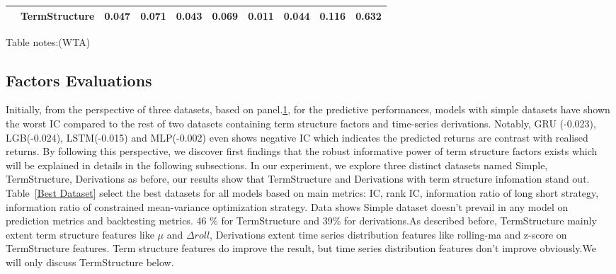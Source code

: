 \documentclass[10pt,letterpaper]{article}
\begin{document}
\begin{table}[!ht]
\begin{adjustwidth}{-2.25in}{0in}
\begin{tabular}{llrrrrp{1.5cm}p{1.5cm}p{1.5cm}p{1.5cm}}
    & TermStructure &  0.047 &  0.071 &    0.043 &      0.069 &                    0.011 &                    0.044 &                         0.116 &                         0.632 \\
\bottomrule
\end{tabular}
\begin{flushleft} Table notes:(WTA)
\end{flushleft}
\label{summary}
\end{adjustwidth}
\end{table}

\subsection*{Factors Evaluations}
Initially, from the perspective of three datasets, based on panel.\ref{summary}, for the predictive performances, models with simple datasets have shown the worst IC compared to the rest of two datasets containing term structure factors and time-series derivations. Notably, GRU (-0.023), LGB(-0.024), LSTM(-0.015) and MLP(-0.002) even shows negative IC which indicates the predicted returns are contrast with realised returns. By following this perspective, we discover  first findings that the robust informative power of term structure factors exists which will be explained in details in the following subsections. In our experiment, we explore three distinct datasets named Simple, TermStructure, Derivations as before, our results show that TermStructure and Derivations with term structure infomation stand out.
\\Table~\ref{Best Dataset} select the best datasets for all models based on main metrics: IC, rank IC, information ratio of long short strategy, information ratio of constrained mean-variance optimization strategy.
Data shows Simple dataset doesn't prevail in any model on prediction metrics and backtesting metrics. 46 \% for TermStructure and 39\% for derivations.As described before, TermStructure mainly extent term structure features like $\mu$ and $\Delta roll$, Derivations extent time series distribution features like rolling-ma and z-score on TermStructure features. Term structure features do improve the result, but time series distribution features don't improve obviously.We will only discuss TermStructure below.
\end{document}
